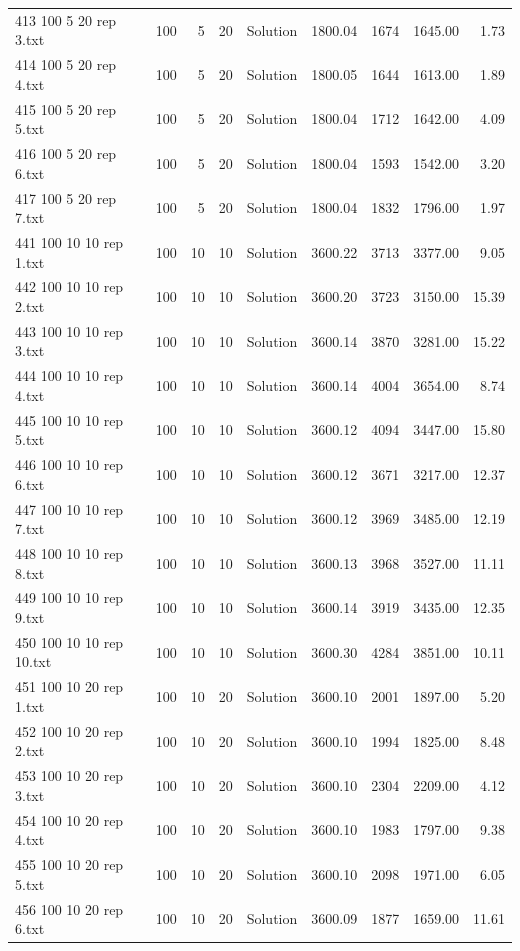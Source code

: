 \begin{longtable}{lrrllrrrr}
413 100 5 20 rep 3.txt & 100 & 5 & 20 & Solution & 1800.04 & 1674 & 1645.00 &  1.73\\
414 100 5 20 rep 4.txt & 100 & 5 & 20 & Solution & 1800.05 & 1644 & 1613.00 &  1.89\\
415 100 5 20 rep 5.txt & 100 & 5 & 20 & Solution & 1800.04 & 1712 & 1642.00 &  4.09\\
416 100 5 20 rep 6.txt & 100 & 5 & 20 & Solution & 1800.04 & 1593 & 1542.00 &  3.20\\
417 100 5 20 rep 7.txt & 100 & 5 & 20 & Solution & 1800.04 & 1832 & 1796.00 &  1.97\\
441 100 10 10 rep 1.txt & 100 & 10 & 10 & Solution & 3600.22 & 3713 & 3377.00 &  9.05\\
442 100 10 10 rep 2.txt & 100 & 10 & 10 & Solution & 3600.20 & 3723 & 3150.00 & 15.39\\
443 100 10 10 rep 3.txt & 100 & 10 & 10 & Solution & 3600.14 & 3870 & 3281.00 & 15.22\\
444 100 10 10 rep 4.txt & 100 & 10 & 10 & Solution & 3600.14 & 4004 & 3654.00 &  8.74\\
445 100 10 10 rep 5.txt & 100 & 10 & 10 & Solution & 3600.12 & 4094 & 3447.00 & 15.80\\
446 100 10 10 rep 6.txt & 100 & 10 & 10 & Solution & 3600.12 & 3671 & 3217.00 & 12.37\\
447 100 10 10 rep 7.txt & 100 & 10 & 10 & Solution & 3600.12 & 3969 & 3485.00 & 12.19\\
448 100 10 10 rep 8.txt & 100 & 10 & 10 & Solution & 3600.13 & 3968 & 3527.00 & 11.11\\
449 100 10 10 rep 9.txt & 100 & 10 & 10 & Solution & 3600.14 & 3919 & 3435.00 & 12.35\\
450 100 10 10 rep 10.txt & 100 & 10 & 10 & Solution & 3600.30 & 4284 & 3851.00 & 10.11\\
451 100 10 20 rep 1.txt & 100 & 10 & 20 & Solution & 3600.10 & 2001 & 1897.00 &  5.20\\
452 100 10 20 rep 2.txt & 100 & 10 & 20 & Solution & 3600.10 & 1994 & 1825.00 &  8.48\\
453 100 10 20 rep 3.txt & 100 & 10 & 20 & Solution & 3600.10 & 2304 & 2209.00 &  4.12\\
454 100 10 20 rep 4.txt & 100 & 10 & 20 & Solution & 3600.10 & 1983 & 1797.00 &  9.38\\
455 100 10 20 rep 5.txt & 100 & 10 & 20 & Solution & 3600.10 & 2098 & 1971.00 &  6.05\\
456 100 10 20 rep 6.txt & 100 & 10 & 20 & Solution & 3600.09 & 1877 & 1659.00 & 11.61\\

\end{longtable}
